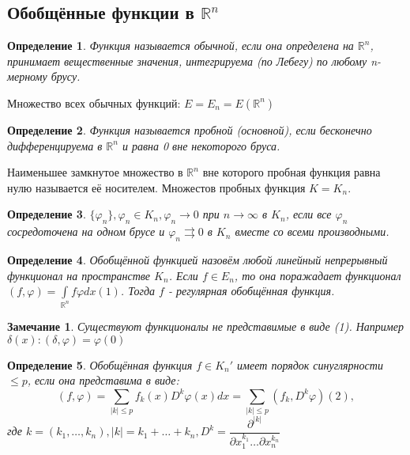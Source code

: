 \documentclass[9pt, a4paper]{article}
\newtheorem*{notabene}{Замечание}
\newtheorem*{definition}{Определение}
\begin{document}
	\subsection{Обобщённые функции в $\mathbb{R}^n$}
		\begin{definition}
			Функция называется обычной, если она определена на $\mathbb{R}^n$, принимает вещественные значения, интегрируема (по Лебегу) по любому n-мерному брусу.
		\end{definition}
		Множество всех обычных функций: $E = E_n = E(\mathbb{R}^n)$
		\begin{definition}
			Функция называется пробной (основной), если бесконечно дифференцируема в $\mathbb{R}^n$ и равна 0 вне некоторого бруса.
		\end{definition}
		Наименьшее замкнутое множество в $\mathbb{R}^n$ вне которого пробная функция равна нулю называется её носителем.  Множестов пробных функция $K = K_n$. 
			\begin{definition}
				$\{\varphi_n\}, \varphi_n \in K_n, \varphi_n \to 0$ при $n\to\infty$ в $K_n$, если все $\varphi_n$ сосредоточена на одном брусе и $\varphi_n \rightrightarrows 0 $ в $K_n$ вместе со всеми производными.		
			\end{definition}
		\begin{definition}
			Обобщённой функцией назовём любой линейный непрерывный функционал на пространстве $K_n$. Если $f \in E_n$, то она поражадает функционал $(f, \varphi) = \int\limits_{\mathbb{R}^n} f\varphi dx (1)$. Тогда $f$ - регулярная обобщённая функция.
		\end{definition}
		\begin{notabene}
			Существуют функционалы не представимые в виде (1). Например $\delta(x): (\delta, \varphi) = \varphi(0)$
		\end{notabene}
		\begin{definition}
			Обобщённая функция $f \in K_n'$ имеет порядок синуглярности $\leq p$, если она представима в виде: 
			\begin{equation*}
				(f,\varphi) = \sum\limits_{|k| \leq p} f_k(x) D^k \varphi(x) dx  = \sum\limits_{|k| \leq p} (f_k, D^k \varphi) (2), 
			\end{equation*}
			где $k = (k_1, \dots, k_n), |k| = k_1 + \dots + k_n, D^k = \dfrac{\partial^{|k|}}{\partial x_1^{k_1} \dots \partial x_n^{k_n}}$
		\end{definition}
\end{document}
